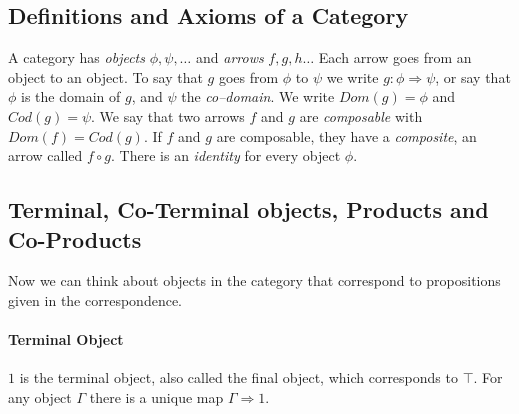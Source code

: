 \subsection{Definitions and Axioms of a Category}
A category has \emph{objects} $\phi,\psi, \ldots$ and \emph{arrows} $f,g,h\ldots$ Each arrow goes from an object to an object. To say that $g$ goes from $\phi$ to $\psi$ we write $g:\phi\Rightarrow\psi$, or say that $\phi$ is the domain of $g$, and $\psi$ the \emph{co--domain}. We write $Dom(g)=\phi$ and $Cod(g)=\psi$.
We say that two arrows $f$ and $g$ are \emph{composable} with $Dom(f)=Cod(g)$. If $f$ and $g$ are composable, they have a \emph{composite}, an arrow called $f\circ g$. There is an \emph{identity} for every object $\phi$.
\begin{mdframed}
\end{mdframed}



\subsection{Terminal, Co-Terminal objects, Products and Co-Products}
Now we can think about objects in the category that correspond to propositions given in the correspondence.

\paragraph{Terminal Object}
$1$ is the terminal object, also called the final object, which corresponds to $\top$. For any object $\Gamma$ there is a unique map $\Gamma\Longrightarrow 1$. 
\begin{mdframed}
\end{mdframed}



